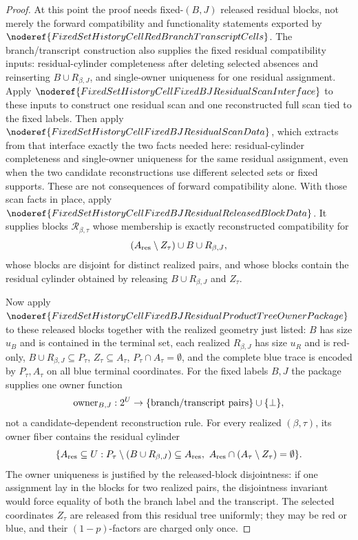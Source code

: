 \begin{proof}
At this point the proof needs fixed-\((B,J)\) released residual blocks, not
merely the forward compatibility and functionality statements exported by
\(\noderef{FixedSetHistoryCellRedBranchTranscriptCells}\).  The
branch/transcript construction also supplies the fixed residual
compatibility inputs: residual-cylinder completeness after deleting
selected absences and reinserting \(B\cup R_{\beta,J}\), and single-owner
uniqueness for one residual assignment.  Apply
\(\noderef{FixedSetHistoryCellFixedBJResidualScanInterface}\) to these
inputs to construct one residual scan and one reconstructed full scan tied
to the fixed labels.  Then apply
\(\noderef{FixedSetHistoryCellFixedBJResidualScanData}\), which extracts
from that interface exactly the two facts needed here:
residual-cylinder completeness and single-owner uniqueness for the same
residual assignment, even when the two candidate reconstructions use
different selected sets or fixed supports.  These are not consequences of
forward compatibility alone.  With those scan facts in place, apply
\(\noderef{FixedSetHistoryCellFixedBJResidualReleasedBlockData}\).
It supplies blocks
\(\mathcal R_{\beta,\tau}\) whose membership is exactly reconstructed
compatibility for
\[
(A_{\rm res}\setminus Z_\tau)\cup B\cup R_{\beta,J},
\]
whose blocks are disjoint for distinct realized pairs, and whose blocks
contain the residual cylinder obtained by releasing
\(B\cup R_{\beta,J}\) and \(Z_\tau\).

Now apply
\(\noderef{FixedSetHistoryCellFixedBJResidualProductTreeOwnerPackage}\) to
these released blocks together with the realized geometry just listed:
\(B\) has size \(u_B\) and is contained in the terminal set, each realized
\(R_{\beta,J}\) has size \(u_R\) and is red-only, \(B\cup R_{\beta,J}
\subseteq P_\tau\), \(Z_\tau\subseteq A_\tau\), \(P_\tau\cap A_\tau=\emptyset\),
and the complete blue trace is encoded by \(P_\tau,A_\tau\) on all blue
terminal coordinates.  For the fixed labels \(B,J\) the package supplies one
owner function
\[
\operatorname{owner}_{B,J}:2^U\to
  \{\hbox{branch/transcript pairs}\}\cup\{\bot\},
\]
not a candidate-dependent reconstruction rule.  For every realized
\((\beta,\tau)\), its owner fiber contains the residual cylinder
\[
\{A_{\rm res}\subseteq U:
P_\tau\setminus(B\cup R_{\beta,J})\subseteq A_{\rm res},\ 
A_{\rm res}\cap(A_\tau\setminus Z_\tau)=\emptyset\}.
\]
The owner uniqueness is justified by the released-block disjointness: if
one assignment lay in the blocks for two realized pairs, the disjointness
invariant would force equality of both the branch label and the transcript.
The selected coordinates \(Z_\tau\) are released from this residual tree
uniformly; they may be red or blue, and their \((1-p)\)-factors are charged
only once.


\end{proof}
